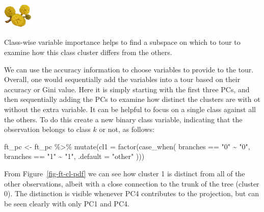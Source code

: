 \documentclass[
  letterpaper,
]{krantz}
\newenvironment{Shaded}{\begin{snugshade}}{\end{snugshade}}
\newcommand{\AttributeTok}[1]{\textcolor[rgb]{0.40,0.45,0.13}{#1}}
\newcommand{\FunctionTok}[1]{\textcolor[rgb]{0.28,0.35,0.67}{#1}}
\newcommand{\NormalTok}[1]{\textcolor[rgb]{0.00,0.23,0.31}{#1}}
\newcommand{\OtherTok}[1]{\textcolor[rgb]{0.00,0.23,0.31}{#1}}
\newcommand{\SpecialCharTok}[1]{\textcolor[rgb]{0.37,0.37,0.37}{#1}}
\newcommand{\StringTok}[1]{\textcolor[rgb]{0.13,0.47,0.30}{#1}}
\newcommand{\infobox}[1]{%
\noindent\colorbox{info!30}{%
\begin{minipage}{0.98\linewidth}%
    \centering%
    \begin{minipage}[c]{0.15\linewidth} %
      \includegraphics[width=1.5cm]{images/mulga-flowers2.png} %
    \end{minipage}%
    \hfill %
    \begin{minipage}[c]{0.8\linewidth} %
      \bigskip%
      \textsf{#1}%
      \bigskip%
    \end{minipage}%
    \hspace*{3mm}%
  \end{minipage}%
}%
}
\begin{document}
\infobox{Class-wise variable importance helps to find a subspace on which to tour to examine how this class cluster differs from the others.}

We can use the accuracy information to choose variables to provide to
the tour. Overall, one would sequentially add the variables into a tour
based on their accuracy or Gini value. Here it is simply starting with
the first three PCs, and then sequentially adding the PCs to examine how
distinct the clusters are with ot without the extra variable. It can be
helpful to focus on a single class against all the others. To do this
create a new binary class variable, indicating that the observation
belongs to class \(k\) or not, as follows:

\begin{Shaded}
\begin{Highlighting}[]
\NormalTok{ft\_pc }\OtherTok{\textless{}{-}}\NormalTok{ ft\_pc }\SpecialCharTok{\%\textgreater{}\%}
  \FunctionTok{mutate}\NormalTok{(}\AttributeTok{cl1 =} \FunctionTok{factor}\NormalTok{(}\FunctionTok{case\_when}\NormalTok{(}
\NormalTok{                 branches }\SpecialCharTok{==} \StringTok{"0"} \SpecialCharTok{\textasciitilde{}} \StringTok{"0"}\NormalTok{,}
\NormalTok{                 branches }\SpecialCharTok{==} \StringTok{"1"} \SpecialCharTok{\textasciitilde{}} \StringTok{"1"}\NormalTok{,}
                 \AttributeTok{.default =} \StringTok{"other"}
\NormalTok{  )))}
\end{Highlighting}
\end{Shaded}

From Figure~\ref{fig-ft-cl-pdf} we can see how cluster 1 is distinct
from all of the other observations, albeit with a close connection to
the trunk of the tree (cluster 0). The distinction is visible whenever
PC4 contributes to the projection, but can be seen clearly with only PC1
and PC4.
\end{document}
